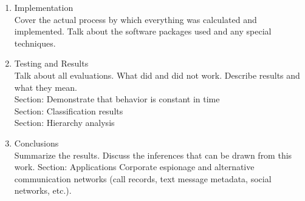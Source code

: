 \documentclass[12pt,dvips]{report}
\begin{document}
\begin{enumerate}
\item Implementation \\
Cover the actual process by which everything was calculated and implemented.  Talk about the software packages used and any special techniques. \\
\item Testing and Results \\
Talk about all evaluations.  What did and did not work.  Describe results and what they mean.\\
Section: Demonstrate that behavior is constant in time\\
Section: Classification results\\
Section: Hierarchy analysis\\
\item Conclusions\\
Summarize the results.  Discuss the inferences that can be drawn from this work.
Section: Applications
Corporate espionage and alternative communication networks (call records, text message metadata, social networks, etc.).
\end{enumerate}
\end{document}
